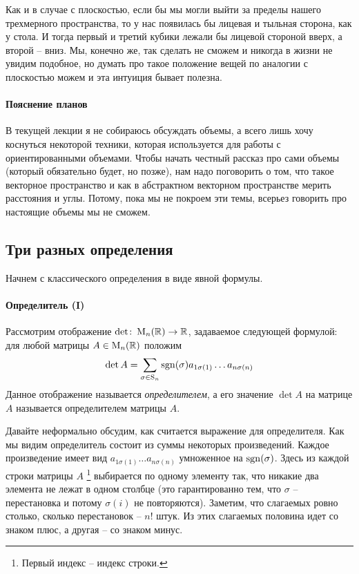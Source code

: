 Как и в случае с плоскостью, если бы мы могли выйти за пределы нашего трехмерного пространства, то у нас появилась бы лицевая и тыльная сторона, как у стола.
И тогда первый и третий кубики лежали бы лицевой стороной вверх, а второй -- вниз.
Мы, конечно же, так сделать не сможем и никогда в жизни не увидим подобное, но думать про такое положение вещей по аналогии с плоскостью можем и эта интуиция бывает полезна.

\paragraph{Пояснение планов}

В текущей лекции я не собираюсь обсуждать объемы, а всего лишь хочу коснуться некоторой техники, которая используется для работы с ориентированными объемами.
Чтобы начать честный рассказ про сами объемы (который обязательно будет, но позже), нам надо поговорить о том, что такое векторное пространство и как в абстрактном векторном пространстве мерить расстояния и углы.
Потому, пока мы не покроем эти темы, всерьез говорить про настоящие объемы мы не сможем.

\subsection{Три разных определения}
\label{section::DetDefs}

Начнем с классического определения в виде явной формулы.

\paragraph{Определитель (I)}

Рассмотрим отображение $\det \colon \operatorname{M}_{n}(\mathbb R)\to \mathbb R$, задаваемое следующей формулой: для любой матрицы $A\in\operatorname{M}_{n}(\mathbb R)$ положим
\[
\det A = \sum_{\sigma \in \operatorname{S}_{n}} \operatorname{sgn}(\sigma) a_{1\sigma(1)}\ldots a_{n\sigma(n)}
\]
Данное отображение называется {\it определителем}, а его значение $\det A$ на матрице $A$ называется определителем матрицы $A$.

Давайте неформально обсудим, как считается выражение для определителя.
Как мы видим определитель состоит из суммы некоторых произведений.
Каждое произведение имеет вид $a_{1\sigma(1)}\ldots a_{n\sigma(n)}$ умноженное на $\operatorname{sgn}(\sigma)$.
Здесь из каждой строки матрицы $A$%
\footnote{Первый индекс -- индекс строки.}
выбирается по одному элементу так, что никакие два элемента не лежат в одном столбце (это гарантированно тем, что $\sigma$ -- перестановка и потому $\sigma(i)$ не повторяются).
Заметим, что слагаемых ровно столько, сколько перестановок -- $n!$ штук.
Из этих слагаемых половина идет со знаком плюс, а другая -- со знаком минус.

